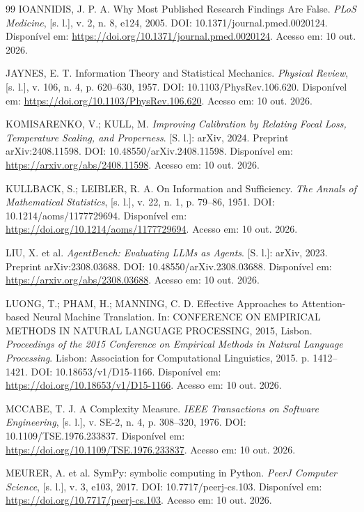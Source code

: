 \documentclass[12pt,openany,oneside,a4paper,brazil,chapter=TITLE]{abntex2}
\begin{document}
\begin{SingleSpacing}
\begin{thebibliography}{99}
 IOANNIDIS, J. P. A. Why Most Published Research Findings Are False. \textit{PLoS Medicine}, [s. l.], v. 2, n. 8, e124, 2005. DOI: 10.1371/journal.pmed.0020124. Disponível em: \url{https://doi.org/10.1371/journal.pmed.0020124}. Acesso em: 10 out. 2026.

 JAYNES, E. T. Information Theory and Statistical Mechanics. \textit{Physical Review}, [s. l.], v. 106, n. 4, p. 620--630, 1957. DOI: 10.1103/PhysRev.106.620. Disponível em: \url{https://doi.org/10.1103/PhysRev.106.620}. Acesso em: 10 out. 2026.

 KOMISARENKO, V.; KULL, M. \textit{Improving Calibration by Relating Focal Loss, Temperature Scaling, and Properness}. [S. l.]: arXiv, 2024. Preprint arXiv:2408.11598. DOI: 10.48550/arXiv.2408.11598. Disponível em: \url{https://arxiv.org/abs/2408.11598}. Acesso em: 10 out. 2026.

 KULLBACK, S.; LEIBLER, R. A. On Information and Sufficiency. \textit{The Annals of Mathematical Statistics}, [s. l.], v. 22, n. 1, p. 79--86, 1951. DOI: 10.1214/aoms/1177729694. Disponível em: \url{https://doi.org/10.1214/aoms/1177729694}. Acesso em: 10 out. 2026.

 LIU, X. et al. \textit{AgentBench: Evaluating LLMs as Agents}. [S. l.]: arXiv, 2023. Preprint arXiv:2308.03688. DOI: 10.48550/arXiv.2308.03688. Disponível em: \url{https://arxiv.org/abs/2308.03688}. Acesso em: 10 out. 2026.

 LUONG, T.; PHAM, H.; MANNING, C. D. Effective Approaches to Attention-based Neural Machine Translation. In: CONFERENCE ON EMPIRICAL METHODS IN NATURAL LANGUAGE PROCESSING, 2015, Lisbon. \textit{Proceedings of the 2015 Conference on Empirical Methods in Natural Language Processing}. Lisbon: Association for Computational Linguistics, 2015. p. 1412--1421. DOI: 10.18653/v1/D15-1166. Disponível em: \url{https://doi.org/10.18653/v1/D15-1166}. Acesso em: 10 out. 2026.

 MCCABE, T. J. A Complexity Measure. \textit{IEEE Transactions on Software Engineering}, [s. l.], v. SE-2, n. 4, p. 308--320, 1976. DOI: 10.1109/TSE.1976.233837. Disponível em: \url{https://doi.org/10.1109/TSE.1976.233837}. Acesso em: 10 out. 2026.

 MEURER, A. et al. SymPy: symbolic computing in Python. \textit{PeerJ Computer Science}, [s. l.], v. 3, e103, 2017. DOI: 10.7717/peerj-cs.103. Disponível em: \url{https://doi.org/10.7717/peerj-cs.103}. Acesso em: 10 out. 2026.


\end{thebibliography}
\end{SingleSpacing}
\end{document}
